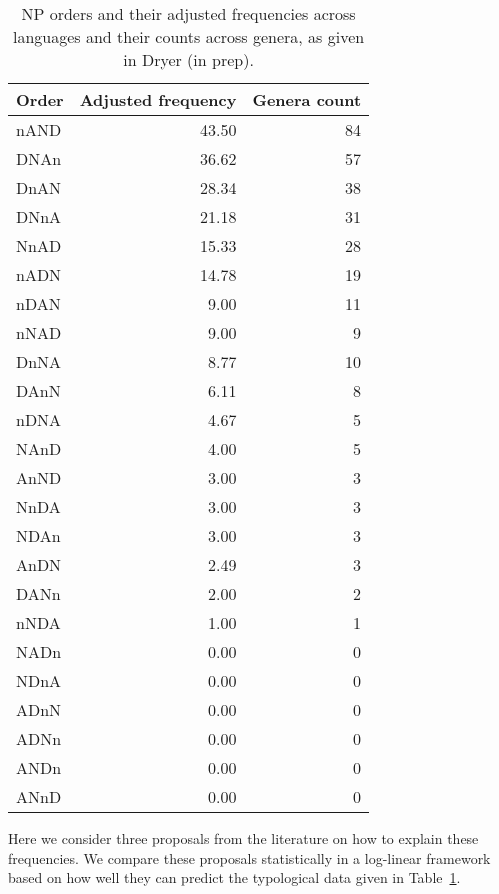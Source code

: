 \documentclass[11pt]{article}
\begin{document}
\begin{table}
  \centering
  \begin{tabular}{|l|r|r|}
    \hline
    Order & Adjusted frequency & Genera count \\
    \hline
    nAND &               43.50 &    84 \\
    DNAn &               36.62 &    57 \\
    DnAN &               28.34 &    38 \\
    DNnA &               21.18 &    31 \\
    NnAD &               15.33 &    28 \\
    nADN &               14.78 &    19 \\
    nDAN &                9.00 &    11 \\
    nNAD &                9.00 &     9 \\
    DnNA &                8.77 &    10 \\
    DAnN &                6.11 &     8 \\
    nDNA &                4.67 &     5 \\
    NAnD &                4.00 &     5 \\
    AnND &                3.00 &     3 \\
    NnDA &                3.00 &     3 \\
    NDAn &                3.00 &     3 \\
    AnDN &                2.49 &     3 \\
    DANn &                2.00 &     2 \\
    nNDA &                1.00 &     1 \\
    NADn &                0.00 &     0 \\
    NDnA &                0.00 &     0 \\
    ADnN &                0.00 &     0 \\
    ADNn &                0.00 &     0 \\
    ANDn &                0.00 &     0 \\
    ANnD &                0.00 &     0 \\
    \hline
  \end{tabular}
  \caption{NP orders and their adjusted frequencies across languages and their counts across genera, as given in Dryer (in prep).}
  \label{tab:order-freqs}
\end{table}

Here we consider three proposals from the literature on how to explain these frequencies.
We compare these proposals statistically in a log-linear framework based on how well they can predict the typological data given in Table~\ref{tab:order-freqs}.
\end{document}
